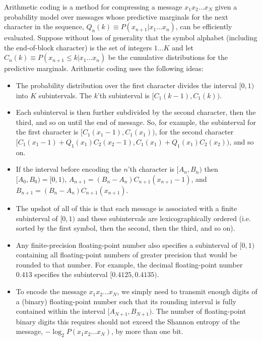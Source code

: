 \documentclass[english]{article}
\begin{document}
Arithmetic coding is a method for compressing a message $x_1 x_2 \ldots x_N$
given a probability model over messages whose predictive marginals for the next character in the sequence, $Q_n(k) \equiv P(x_{n+1}|x_1 \ldots x_n)$,
can be efficiently evaluated.
Suppose without loss of generality that the symbol alphabet (including the end-of-block character) is the set of integers $1 \ldots K$
and let $C_n(k) \equiv P(x_{n+1} \leq k | x_1 \ldots x_n)$ be the cumulative distributions for the predictive marginals.
Arithmetic coding uses the following ideas:
\begin{itemize}
\item The probability distribution over the first character divides the interval $[0,1)$ into $K$ subintervals.
  The $k$'th subinterval is $[C_1(k-1),C_1(k))$.
  \item Each subinterval is then further subdivided by the second character, then the third, and so on until the end of message.
    So, for example, the subinterval for the first character is $[C_1(x_1-1),C_1(x_1))$,
      for the second character $[C_1(x_1-1) + Q_1(x_1) C_2(x_2-1),C_1(x_1) + Q_1(x_1) C_2(x_2))$,
          and so on.
        \item If the interval before encoding the $n$'th character is $[A_n,B_n)$ then
          $[A_0,B_0) = [0,1)$,
              $A_{n+1} = (B_n-A_n) C_{n+1}(x_{n+1}-1)$,
              and $B_{n+1} = (B_n-A_n) C_{n+1}(x_{n+1})$.
            \item The upshot of all of this is that each message is associated with a finite subinterval of $[0,1)$
              and these subintervals are lexicographically ordered (i.e. sorted by the first symbol, then the second, then the third, and so on).
            \item Any finite-precision floating-point number also specifies a subinterval of $[0,1)$
              containing all floating-point numbers of greater precision that would be rounded to that number.
              For example, the decimal floating-point number $0.413$ specifies the subinterval $[0.4125,0.4135)$.
              \item To encode the message $x_1 x_2 \ldots x_N$,
                we simply need to transmit enough digits of a (binary) floating-point number such that its
                rounding interval is fully contained within the interval $[A_{N+1},B_{N+1})$.
                  The number of floating-point binary digits this requires should not exceed the Shannon entropy of the message,
                  $-\log_2 P(x_1 x_2 \ldots x_N)$, by more than one bit.
\end{itemize}
\end{document}
